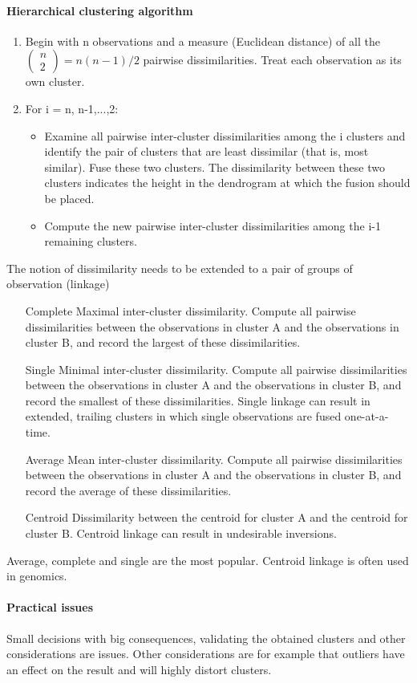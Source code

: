 \documentclass[../document.tex]{subfiles}
\begin{document}
	\paragraph{Hierarchical clustering algorithm}
	\begin{enumerate}
		\item Begin with n observations and a measure (Euclidean distance) of all the
		\(
		\begin{pmatrix}
			n\\2
		\end{pmatrix} = n(n-1)/2
		\)
		 pairwise dissimilarities. Treat each observation as its own cluster.
		\item For i = n, n-1,...,2:
		\begin{itemize}
			\item Examine all pairwise inter-cluster dissimilarities among the i clusters and identify the pair of clusters that are least dissimilar (that is, most similar). Fuse these two clusters. The dissimilarity between these two clusters indicates the height in the dendrogram at which the fusion should be placed.
			\item Compute the new pairwise inter-cluster dissimilarities among the i-1 remaining clusters.
		\end{itemize}
	\end{enumerate}
	The notion of dissimilarity needs to be extended to a pair of groups of observation (linkage)
	\begin{itemize}
		\item [Complete] Maximal inter-cluster dissimilarity. Compute all pairwise dissimilarities between the observations in cluster A and the observations in cluster B, and record the largest of these dissimilarities.
		\item [Single] Minimal inter-cluster dissimilarity. Compute all pairwise dissimilarities between the observations in cluster A and the observations in cluster B, and record the smallest of these dissimilarities. Single linkage can result in extended, trailing clusters in which single observations are fused one-at-a-time.
		\item [Average] Mean inter-cluster dissimilarity. Compute all pairwise dissimilarities between the observations in cluster A and the observations in cluster B, and record the average of these dissimilarities.
		\item [Centroid] Dissimilarity between the centroid for cluster A and the centroid for cluster B. Centroid linkage can result in undesirable inversions.
	\end{itemize}
	Average, complete and single are the most popular. Centroid linkage is often used in genomics.
	\paragraph{Practical issues}
	Small decisions with big consequences, validating the obtained clusters and other considerations are issues. Other considerations are for example that outliers have an effect on the result and will highly distort clusters.
\end{document}
